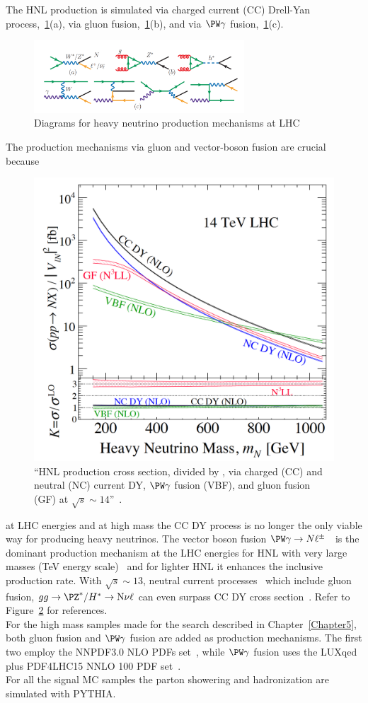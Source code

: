 The HNL production is simulated via charged current (CC) Drell-Yan
process,~\ref{fid:hnl_production}(a), via gluon
fusion,~\ref{fid:hnl_production}(b), and via $\PW \gamma$
fusion,~\ref{fid:hnl_production}(c). 
\begin{figure}[h!]
\centering
 \includegraphics[clip,trim=0cm 0cm 0cm 1cm, width=0.70\textwidth]{Figures/c4/hnl_production}
  \caption{Diagrams for heavy neutrino production mechanisms at LHC~\cite{Pascoli_2019}}
  \label{fid:hnl_production}
\end{figure}

The production mechanisms via gluon and vector-boson fusion are
crucial because
\begin{figure}
  \includegraphics[clip,trim=0cm 0cm 0.5cm 0.5cm, width=.39\textwidth]{Figures/c4/hnl_lhc_production}
  \caption{``HNL production cross section, divided by \mixpar, via
charged (CC) and neutral (NC) current DY, $\PW \gamma$ fusion (VBF),
and gluon fusion (GF) at $\sqrt{s}
\sim 14$\TeV ''~\cite{Pascoli_2019}.}
  \label{fig:hnl_lhc_graph}
\end{figure} 
 at LHC energies and at high \hnl mass the CC DY process
is no longer the only viable way for producing heavy neutrinos. The
vector boson fusion $\PW \gamma \rightarrow N
\ell^{\pm}$~\cite{PhysRevLett.112.081801, Alva:2014gxa,Degrande_2016}
is the dominant production mechanism at the LHC 
energies for HNL with very large masses
(TeV energy scale)~\cite{Alva:2014gxa,Degrande_2016, Pascoli_2019} and for
lighter HNL it enhances the inclusive production rate. With $\sqrt{s}
\sim 13$\TeV, neutral current
processes~\cite{PhysRevD.44.1593,WILLENBROCK1985429} which include
gluon fusion, $gg \rightarrow \PZ^{*}/H^{*} \rightarrow \hnl \nu \ell$
can even surpass CC DY cross section~\cite{PhysRevD.96.055042,
  Pascoli_2019}. Refer to Figure~\ref{fig:hnl_lhc_graph} for
references.\\
For the high mass \hnl samples made for the search described in
Chapter~\ref{Chapter5}, both gluon
fusion and $\PW \gamma$
fusion are added as production mechanisms. 
The first two employ
the NNPDF3.0 NLO PDFs set~\cite{Ball_2015}, while $\PW \gamma$
fusion uses the LUXqed plus PDF4LHC15 NNLO 100
PDF set~\cite{PhysRevLett.117.242002}.\\
For all the signal MC samples the parton showering and hadronization are simulated with PYTHIA. \\

